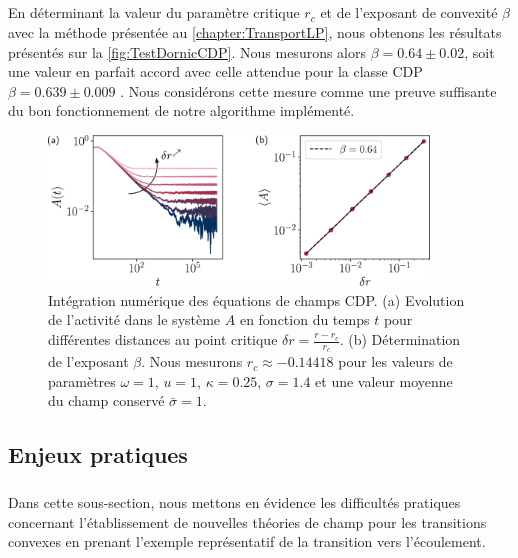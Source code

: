 \subparagraph{}En déterminant la valeur du paramètre critique $r_c$ et de l'exposant de convexité $\beta$ avec la méthode présentée au \autoref{chapter:TransportLP}, nous obtenons les résultats présentés sur la \autoref{fig:TestDornicCDP}. Nous mesurons alors $\beta = 0.64 \pm 0.02$, soit une valeur en parfait accord avec celle attendue pour la classe CDP $\beta = 0.639 \pm 0.009$ \cite{lubeck_universal_2004}. Nous considérons cette mesure comme une preuve suffisante du bon fonctionnement de notre algorithme implémenté.

\begin{figure}[h]
	\centering
	\includegraphics[width=0.9\textwidth]{Chapitre6/Figures/betaCDP_Langevin.pdf}
	\caption{Intégration numérique des équations de champs CDP. (a) Evolution de l'activité dans le système $ A $ en fonction du temps $t$ pour différentes distances au point critique $\delta r = \frac{r-r_c}{r_c}$. (b) Détermination de l'exposant $\beta$. Nous mesurons $r_c \approx -0.14418$ pour les valeurs de paramètres $\omega = 1$, $u = 1$, $\kappa = 0.25$, $\sigma = 1.4$ et une valeur moyenne du champ conservé $\bar{\sigma} = 1$.}
	\label{fig:TestDornicCDP}
\end{figure}

\subsection{Enjeux pratiques}

\subparagraph{}Dans cette sous-section, nous mettons en évidence les difficultés pratiques concernant l'établissement de nouvelles théories de champ pour les transitions convexes en prenant l'exemple représentatif de la transition vers l'écoulement.

